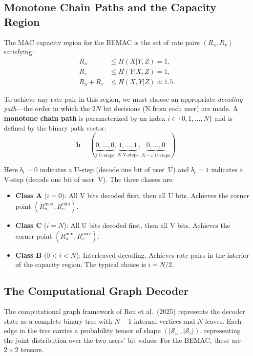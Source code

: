 \documentclass[11pt,a4paper]{article}
\begin{document}
\subsection{Monotone Chain Paths and the Capacity Region}
\label{sec:monotone_chain}

The MAC capacity region for the BEMAC is the set of rate pairs $(R_u, R_v)$ satisfying:
\begin{align}
    R_u &\leq H(X | Y, Z) = 1, \\
    R_v &\leq H(Y | X, Z) = 1, \\
    R_u + R_v &\leq H(X, Y | Z) \approx 1.5.
\end{align}

To achieve any rate pair in this region, we must choose an appropriate \emph{decoding path}---the order in which the $2N$ bit decisions (N from each user) are made. A \textbf{monotone chain path} is parameterized by an index $i \in \{0, 1, \ldots, N\}$ and is defined by the binary path vector:
\begin{equation}
    \bm{b} = (\underbrace{0, \ldots, 0}_{i \text{ U-steps}}, \underbrace{1, \ldots, 1}_{N \text{ V-steps}}, \underbrace{0, \ldots, 0}_{N - i \text{ U-steps}}).
    \label{eq:path_vector}
\end{equation}

Here $b_t = 0$ indicates a U-step (decode one bit of user~U) and $b_t = 1$ indicates a V-step (decode one bit of user~V). The three classes are:

\begin{itemize}
    \item \textbf{Class A} ($i = 0$): All V bits decoded first, then all U bits. Achieves the corner point $(R_u^{\max}, R_v^{\min})$.
    \item \textbf{Class C} ($i = N$): All U bits decoded first, then all V bits. Achieves the corner point $(R_u^{\min}, R_v^{\max})$.
    \item \textbf{Class B} ($0 < i < N$): Interleaved decoding. Achieves rate pairs in the interior of the capacity region. The typical choice is $i = N/2$.
\end{itemize}

\subsection{The Computational Graph Decoder}
\label{sec:comp_graph}

The computational graph framework of Ren et al.\ (2025) represents the decoder state as a complete binary tree with $N - 1$ internal vertices and $N$ leaves. Each edge in the tree carries a probability tensor of shape $(|\mathcal{S}_u|, |\mathcal{S}_v|)$, representing the joint distribution over the two users' bit values. For the BEMAC, these are $2 \times 2$ tensors.
\end{document}
